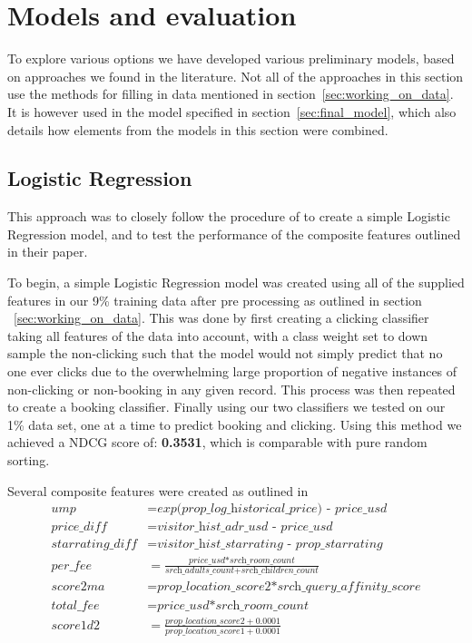 \documentclass{llncs}
\begin{document}
\section{Models and evaluation}
To explore various options we have developed various preliminary models, based on approaches we found in the literature. Not all of the approaches in this section use the methods for filling in data mentioned in section~\ref{sec:working_on_data}. It is however used in the model specified in section~\ref{sec:final_model}, which also details how elements from the models in this section were combined.


\subsection{Logistic Regression}

This approach was to closely follow the procedure of \cite{DBLP:journals/corr/LiuXZYPLSW13} to create a simple Logistic Regression model, and to test the performance of the composite features outlined in their paper.

To begin, a simple Logistic Regression model was created using all of the supplied features in our 9\% training data after pre processing as outlined in section ~\ref{sec:working_on_data}. This was done by first creating a clicking classifier taking all features of the data into account, with a class weight set to down sample the non-clicking such that the model would not simply predict that no one ever clicks due to the overwhelming large proportion of negative instances of non-clicking or non-booking in any given record. This process was then repeated to create a booking classifier.
Finally using our two classifiers we tested on our 1\% data set, one at a time to predict booking and clicking. Using this method we achieved a NDCG score of: \textbf{0.3531}, which is comparable with pure random sorting.

Several composite features were created as outlined in \cite{DBLP:journals/corr/LiuXZYPLSW13}
\begin{align*}
    \textit{ump} &= \textit{exp(prop\_ log\_ historical\_ price) - price\_ usd}\\
    \textit{price\_ diff} &= \textit{visitor\_ hist\_ adr\_ usd - price\_ usd}\\
    \textit{starrating\_ diff} &= \textit{visitor\_ hist\_ starrating - prop\_ starrating}\\
    \textit{per\_ fee} &= \frac{\textit{price\_ usd*srch\_ room\_ count}}{\textit{srch\_ adults\_ count+srch\_ children\_ count}}\\
    \textit{score2ma} &= \textit{prop\_ location\_ score2*srch\_ query\_ affinity\_ score}\\
    \textit{total\_ fee} &= \textit{price\_ usd*srch\_ room\_ count}\\
    \textit{score1d2} &= \frac{\textit{prop\_ location\_ score2} + 0.0001}{\textit{prop\_ location\_ score1} + 0.0001}
\end{align*}
\end{document}
